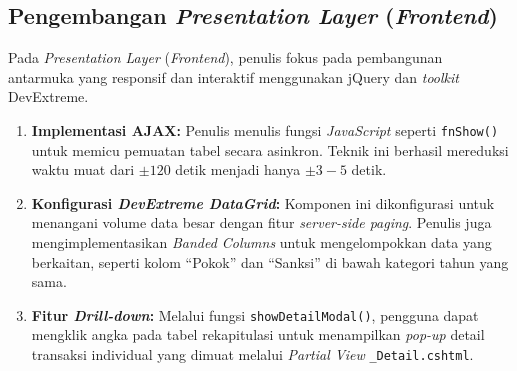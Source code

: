 \subsection{Pengembangan \emph{Presentation Layer} (\emph{Frontend})}
Pada \emph{Presentation Layer} (\emph{Frontend}), penulis fokus pada pembangunan antarmuka yang responsif dan interaktif menggunakan jQuery dan \emph{toolkit} DevExtreme.
\begin{enumerate}
    \item \textbf{Implementasi AJAX:} Penulis menulis fungsi \emph{JavaScript} seperti \texttt{fnShow()} untuk memicu pemuatan tabel secara asinkron. Teknik ini berhasil mereduksi waktu muat dari $\pm 120$ detik menjadi hanya $\pm 3 - 5$ detik.
    \item \textbf{Konfigurasi \emph{DevExtreme DataGrid}:} Komponen ini dikonfigurasi untuk menangani volume data besar dengan fitur \emph{server-side paging}. Penulis juga mengimplementasikan \emph{Banded Columns} untuk mengelompokkan data yang berkaitan, seperti kolom ``Pokok'' dan ``Sanksi'' di bawah kategori tahun yang sama.
    \item \textbf{Fitur \emph{Drill-down}:} Melalui fungsi \texttt{showDetailModal()}, pengguna dapat mengklik angka pada tabel rekapitulasi untuk menampilkan \emph{pop-up} detail transaksi individual yang dimuat melalui \emph{Partial View} \texttt{\_Detail.cshtml}.
\end{enumerate}


